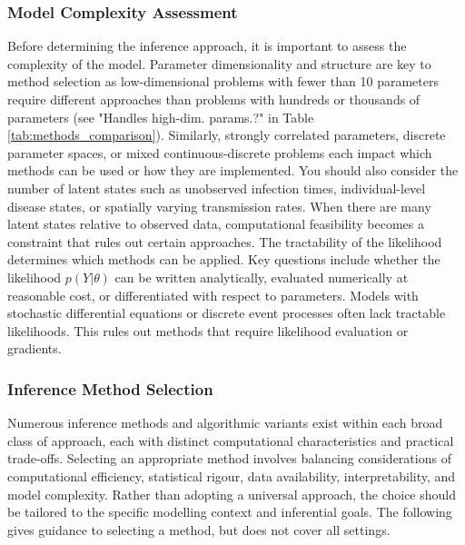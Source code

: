 \documentclass{article}
\begin{document}
\subsubsection{Model Complexity Assessment}

Before determining the inference approach, it is important to assess the complexity of the model.
Parameter dimensionality and structure are key to method selection as low-dimensional problems with fewer than 10 parameters require different approaches than problems with hundreds or thousands of parameters (see "Handles high-dim. params.?" in Table \ref{tab:methods_comparison}).
Similarly, strongly correlated parameters, discrete parameter spaces, or mixed continuous-discrete problems each impact which methods can be used or how they are implemented.
You should also consider the number of latent states such as unobserved infection times, individual-level disease states, or spatially varying transmission rates.
When there are many latent states relative to observed data, computational feasibility becomes a constraint that rules out certain approaches.
The tractability of the likelihood determines which methods can be applied.
Key questions include whether the likelihood $p(Y | \theta)$ can be written analytically, evaluated numerically at reasonable cost, or differentiated with respect to parameters.
Models with stochastic differential equations or discrete event processes often lack tractable likelihoods.
This rules out methods that require likelihood evaluation or gradients.

\subsubsection{Inference Method Selection}

Numerous inference methods and algorithmic variants exist within each broad class of approach, each with distinct computational characteristics and practical trade-offs.
Selecting an appropriate method involves balancing considerations of computational efficiency, statistical rigour, data availability, interpretability, and model complexity.
Rather than adopting a universal approach, the choice should be tailored to the specific modelling context and inferential goals.
The following gives guidance to selecting a method, but does not cover all settings.
\end{document}
